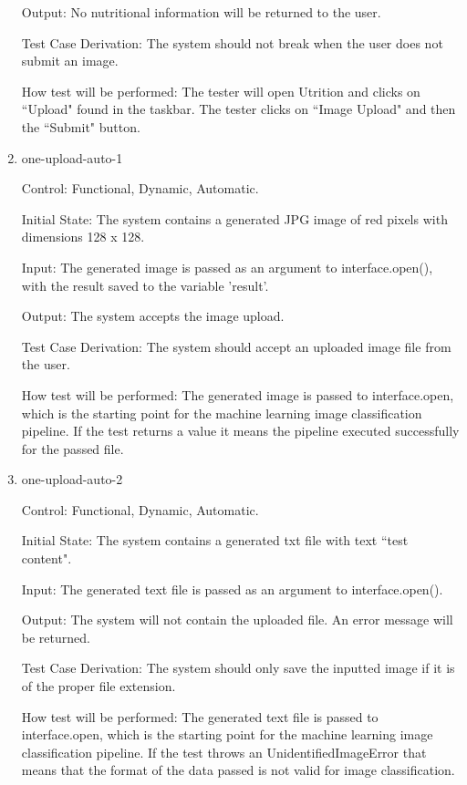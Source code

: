 \documentclass[12pt, titlepage]{article}
\begin{document}
\begin{enumerate}
		Output: No nutritional information will be returned to the user.
		
		Test Case Derivation: The system should not break when the user does not submit an image.
		
		How test will be performed: The tester will open Utrition and clicks on ``Upload" found in the taskbar. The tester clicks on ``Image Upload" and then the ``Submit" button.
		
		\item{one-upload-auto-1\\}
		
		Control: Functional, Dynamic, Automatic.
		
		Initial State: The system contains a generated JPG image of red pixels with dimensions 128 x 128.
		
        Input: The generated image is passed as an argument to interface.open(), with the result saved to the variable 'result'.

		Output: The system accepts the image upload.
		
		Test Case Derivation: The system should accept an uploaded image file from the user.
		
		How test will be performed: The generated image is passed to interface.open, which is the starting point for the machine learning image classification pipeline. If the test returns a value it means the pipeline executed successfully for the passed file.
		
		\item{one-upload-auto-2\\}
		
		Control: Functional, Dynamic, Automatic.
		
		Initial State: The system contains a generated txt file with text ``test content".
		
		Input: The generated text file is passed as an argument to interface.open().
		
		Output: The system will not contain the uploaded file. An error message 
		will be returned.
		
		Test Case Derivation: The system should only save the inputted image if 
		it is of the proper file extension.
		
		How test will be performed: The generated text file is passed to interface.open, which is the starting point for the machine learning image classification pipeline. If the test throws an UnidentifiedImageError that means that the format of the data passed is not valid for image classification.

	\end{enumerate}
	
\end{document}
